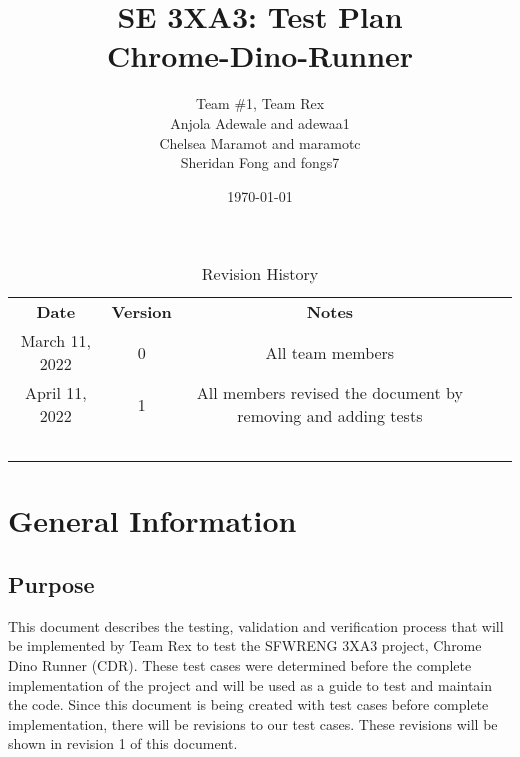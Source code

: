\documentclass[12pt, titlepage]{article}
\title{SE 3XA3: Test Plan\\Chrome-Dino-Runner}
\author{Team \#1, Team Rex
	\\ Anjola Adewale and adewaa1
	\\ Chelsea Maramot and maramotc
	\\ Sheridan Fong and fongs7
}
\date{\today}
\begin{document}
	
	\maketitle
	
	\tableofcontents
	\listoftables
	
	\newpage
	
	\begin{table}[hbt!]
		\caption{Revision History}
		\begin{tabular}{cclll}
			\cline{1-3}
			\multicolumn{1}{|c|}{\textbf{Date}} & \multicolumn{1}{c|}{\textbf{Version}} & \multicolumn{1}{c|}{\textbf{Notes}} & \multicolumn{1}{c}{} &  \\ \cline{1-3}
			\multicolumn{1}{|c|}{March 11, 2022} & \multicolumn{1}{c|}{0} & \multicolumn{1}{c|}{All team members} &  &  \\ \cline{1-3}
			\multicolumn{1}{|c|}{April 11, 2022} & \multicolumn{1}{c|}{1} & \multicolumn{1}{c|}{All members revised the document by removing and adding tests} &  &  \\ \cline{1-3}
			&  &  &  &  \\
			\multicolumn{2}{c}{} &  &  &  \\
			&  &  &  &  \\
			\multicolumn{2}{c}{} &  &  &  \\
			&  &  &  & 
		\end{tabular}
		
		\label{tab:my-table}
	\end{table}
	
	\newpage
	
	
	
	\section{General Information}
	
	\subsection{Purpose}
	This document describes the testing, validation and verification process that will be implemented by Team Rex to test the SFWRENG 3XA3 project, Chrome Dino Runner (CDR). These test cases were determined before the complete implementation of the project and will be used as a guide to test and maintain the code. Since this document is being created with test cases before complete implementation, there will be revisions to our test cases. These revisions will be shown in revision 1 of this document. 
	
\end{document}
